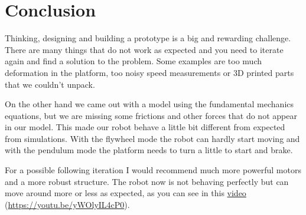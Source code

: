 \section{Conclusion}
Thinking, designing and building a prototype is a big and rewarding challenge.
There are many things that do not work as expected and you need to iterate again
and find a solution to the problem. Some examples are too much deformation in the platform,
too noisy speed measurements or 3D printed parts that we couldn't unpack.

On the other hand we came out with a model using the fundamental mechanics equations, but we are missing
some frictions and other forces that do not appear in our model. This made our robot behave a little bit
different from expected from simulations. With the flywheel mode the robot can hardly start moving and with
the pendulum mode the platform needs to turn a little to start and brake.

For a possible following iteration I would recommend much more powerful motors and a more robust structure.
The robot now is not behaving perfectly but can move around more or less as expected, as you can see in this
\href{https://youtu.be/yWOlyIL4cP0}{video} (\href{https://youtu.be/yWOlyIL4cP0}{https://youtu.be/yWOlyIL4cP0}).